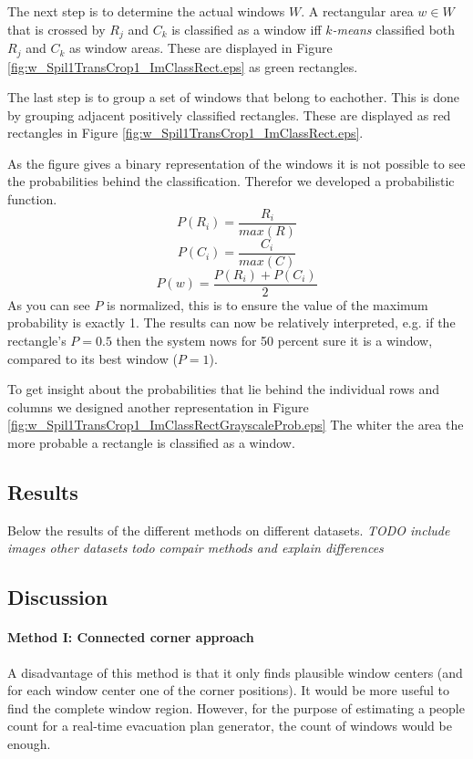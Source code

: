 The next step is to determine the actual windows $W$.
A rectangular area $w\in W$ that is crossed by $R_j$ and $C_k$ is classified as a
window iff \emph{$k$-means} classified both $R_j$ and $C_k$ as window areas. These are displayed in 
 Figure \ref{fig:w_Spil1TransCrop1_ImClassRect.eps} as green rectangles.

The last step is to group a set of windows that belong to eachother. This is done by 
grouping adjacent positively classified rectangles. These are displayed as red
rectangles in Figure \ref{fig:w_Spil1TransCrop1_ImClassRect.eps}.

As the figure gives a binary representation of the windows it is not possible
to see the probabilities behind the classification.
Therefor we developed a probabilistic function. 
\[P(R_i) = \frac{R_i}{max(R)}\]
\[P(C_i) = \frac{C_i}{max(C)}\]
\[P(w) = \frac{P(R_i) + P(C_i)}{2}\]
As you can see $P$ is normalized, this is to ensure the value of the maximum
probability is exactly 1. The results can now be relatively interpreted, e.g. if the rectangle's $P=0.5$
then the system nows for 50 percent sure it is a window, compared to its best window ($P=1$).

To get insight about the probabilities that lie behind the individual rows and columns
we designed another representation in Figure \ref{fig:w_Spil1TransCrop1_ImClassRectGrayscaleProb.eps}
The whiter the area the more probable a rectangle is classified as a window.



\subsection{Results}
Below the results of the different methods on different datasets.
\emph{TODO include images other datasets}
\emph{todo compair methods and explain differences}


\subsection{Discussion}  %
\paragraph{Method I: Connected corner approach} 
A disadvantage of this method is that it only finds plausible window centers
(and for each window center one of the corner positions).  It would be more
useful to find the complete window region. However, for the purpose of estimating
a people count for a real-time evacuation plan generator, the count of windows
would be enough.

